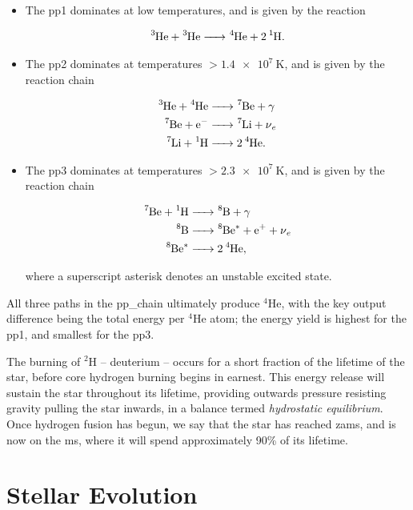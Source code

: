 \begin{itemize}
    \item The \gls{pp1} dominates at low temperatures, and is given by the reaction

    \begin{equation*}
        \ce{^3He + ^3He -> ^4He + 2^1H}.
    \end{equation*}

    \item The \gls{pp2} dominates at temperatures $>\SI{1.4e7}{\kelvin}$, and is given by the reaction chain

    \begin{align*}
        \ce{^3He + ^4He &-> ^7Be + \gamma} \\
        \ce{^7Be + e^-  &-> ^7Li + \nu_e} \\
        \ce{^7Li + ^1H  &-> 2^4He}. \\
    \end{align*}

    \item The \gls{pp3} dominates at temperatures $>\SI{2.3e7}{\kelvin}$, and is given by the reaction chain

    \begin{align*}
        \ce{^7Be + ^1H &-> ^8B + \gamma} \\
        \ce{^8B        &-> ^8Be^* + e^+ + \nu_e} \\
        \ce{^8Be^*     &-> 2^4He}, \\
    \end{align*}

    where a superscript asterisk denotes an unstable excited state.
\end{itemize}

All three paths in the \gls{pp_chain} ultimately produce $^4$He, with the key output difference being the total energy per $^4$He atom; the energy yield is highest for the \gls{pp1}, and smallest for the \gls{pp3}.

The burning of $^2$H -- deuterium -- occurs for a short fraction of the lifetime of the star, before core hydrogen burning begins in earnest. This energy release will sustain the star throughout its lifetime, providing outwards pressure resisting gravity pulling the star inwards, in a balance termed \textit{hydrostatic equilibrium}. Once hydrogen fusion has begun, we say that the star has reached \gls{zams}, and is now on the \gls{ms}, where it will spend approximately 90\% of its lifetime.

\section{Stellar Evolution}


